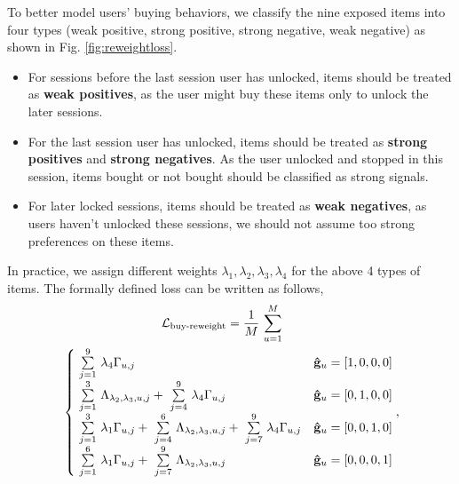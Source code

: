 To better model users' buying behaviors, we classify the nine exposed items into four types (weak positive, strong positive, strong negative, weak negative) as shown in Fig. \ref{fig:reweightloss}.
%
\begin{itemize}
    \item For sessions before the last session user has unlocked, items should be treated as \textbf{weak positives}, as the user might buy these items only to unlock the later sessions.
    \item For the last session user has unlocked, items should be treated as \textbf{strong positives} and \textbf{strong negatives}. As the user unlocked and stopped in this session, items bought or not bought should be classified as strong signals.
    \item For later locked sessions, items should be treated as \textbf{weak negatives}, as users haven't unlocked these sessions, we should not assume too strong preferences on these items.
\end{itemize}
In practice, we assign different weights $\lambda_1, \lambda_2, \lambda_3, \lambda_4$ for the above 4 types of items. The formally defined loss can be written as follows,
\small
\begin{equation}
\begin{aligned}
\centering
 &\quad \quad \quad \quad \quad  \quad \quad \quad     \mathcal{L}_{\text{buy-reweight}} = \frac{1}{M} ~\overset{M}{\underset{u=1}{\sum}} \\
        &\begin{cases}
        ~\overset{9}{\underset{j=1}{\sum}} ~\lambda_4 \Gamma_{u,j}
        & \mathbf{\hat{g}}_{u} = [1,0,0,0] \\
        ~\overset{3}{\underset{j=1}{\sum}} ~\Lambda_{\lambda_2,\lambda_3,u,j} + 
        ~\overset{9}{\underset{j=4}{\sum}} ~\lambda_4 \Gamma_{u,j}
        & \mathbf{\hat{g}}_{u} = [0,1,0,0] \\
        ~\overset{3}{\underset{j=1}{\sum}} ~\lambda_1 \Gamma_{u,j} + 
        ~\overset{6}{\underset{j=4}{\sum}} ~\Lambda_{\lambda_2,\lambda_3,u,j} + 
        ~\overset{9}{\underset{j=7}{\sum}} ~\lambda_4 \Gamma_{u,j}
        & \mathbf{\hat{g}}_{u} = [0,0,1,0] \\
        ~\overset{6}{\underset{j=1}{\sum}} ~\lambda_1 \Gamma_{u,j} + 
        ~\overset{9}{\underset{j=7}{\sum}} ~\Lambda_{\lambda_2,\lambda_3,u,j}
        & \mathbf{\hat{g}}_{u} = [0,0,0,1] \\
        \end{cases}, \\
\end{aligned}
\end{equation}

